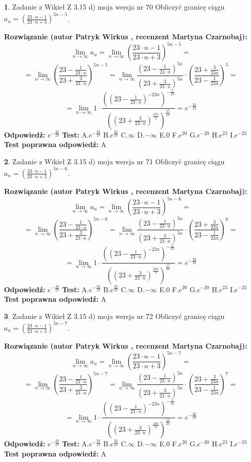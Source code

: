 \documentclass[12pt, a4paper]{article}
\theoremstyle{definition} %
\newtheorem{zad}{}
\newcommand{\zadStart}[1]{\begin{zad}#1\newline}
\newcommand{\zadStop}{\end{zad}}
\newcommand{\rozwStart}[2]{\noindent \textbf{Rozwiązanie (autor #1 , recenzent #2): }\newline}
\newcommand{\rozwStop}{\newline}
\newcommand{\odpStart}{\noindent \textbf{Odpowiedź:}\newline}
\newcommand{\odpStop}{\newline}
\newcommand{\testStart}{\noindent \textbf{Test:}\newline}
\newcommand{\testStop}{\newline}
\newcommand{\kluczStart}{\noindent \textbf{Test poprawna odpowiedź:}\newline}
\newcommand{\kluczStop}{\newline}
\begin{document}
\zadStart{Zadanie z Wikieł Z 3.15 d) moja wersja nr 70}
Obliczyć granicę ciągu $a_{n}=(\frac{23\cdot n - 1}{23 \cdot n + 3})^{5n-5}$.
\zadStop
\rozwStart{Patryk Wirkus}{Martyna Czarnobaj}
$$\lim\limits_{n\to\infty} a_{n} = \lim\limits_{n\to\infty}(\frac{23\cdot n - 1}{23 \cdot n + 3})^{5n-5}=$$
$$=\lim\limits_{n\to\infty}(\frac{23 - \frac{1}{23\cdot n}}{23 + \frac{3}{23 \cdot n}})^{5n-5}=\lim\limits_{n\to\infty}\frac{(23 - \frac{1}{23\cdot n})^{5n}}{(23 + \frac{3}{23\cdot n})^{5n}} \cdot (\frac{23+\frac{3}{23n}}{23-\frac{1}{23n}})^{5}=$$
$$=\lim\limits_{n\to\infty} 1 \cdot \frac{((23-\frac{1}{23 \cdot n})^{-23n})^{-\frac{5}{23}}}{((23+\frac{3}{23 \cdot n})^{\frac{23n}{3}})^{\frac{15}{23}}} =e^{-\frac{20}{23}}$$
\rozwStop
\odpStart
$e^{-\frac{20}{23}}$
\odpStop
\testStart
A.$ e^{-\frac{20}{23}}$
B.$ e^{\frac{20}{23}}$
C.$\infty$
D.$-\infty$
E.$0$
F.$e^{20}$
G.$e^{-20}$
H.$e^{23}$
I.$e^{-23}$
\testStop
\kluczStart
A
\kluczStop



\zadStart{Zadanie z Wikieł Z 3.15 d) moja wersja nr 71}
Obliczyć granicę ciągu $a_{n}=(\frac{23\cdot n - 1}{23 \cdot n + 3})^{5n-6}$.
\zadStop
\rozwStart{Patryk Wirkus}{Martyna Czarnobaj}
$$\lim\limits_{n\to\infty} a_{n} = \lim\limits_{n\to\infty}(\frac{23\cdot n - 1}{23 \cdot n + 3})^{5n-6}=$$
$$=\lim\limits_{n\to\infty}(\frac{23 - \frac{1}{23\cdot n}}{23 + \frac{3}{23 \cdot n}})^{5n-6}=\lim\limits_{n\to\infty}\frac{(23 - \frac{1}{23\cdot n})^{5n}}{(23 + \frac{3}{23\cdot n})^{5n}} \cdot (\frac{23+\frac{3}{23n}}{23-\frac{1}{23n}})^{6}=$$
$$=\lim\limits_{n\to\infty} 1 \cdot \frac{((23-\frac{1}{23 \cdot n})^{-23n})^{-\frac{5}{23}}}{((23+\frac{3}{23 \cdot n})^{\frac{23n}{3}})^{\frac{15}{23}}} =e^{-\frac{20}{23}}$$
\rozwStop
\odpStart
$e^{-\frac{20}{23}}$
\odpStop
\testStart
A.$ e^{-\frac{20}{23}}$
B.$ e^{\frac{20}{23}}$
C.$\infty$
D.$-\infty$
E.$0$
F.$e^{20}$
G.$e^{-20}$
H.$e^{23}$
I.$e^{-23}$
\testStop
\kluczStart
A
\kluczStop



\zadStart{Zadanie z Wikieł Z 3.15 d) moja wersja nr 72}
Obliczyć granicę ciągu $a_{n}=(\frac{23\cdot n - 1}{23 \cdot n + 3})^{5n-7}$.
\zadStop
\rozwStart{Patryk Wirkus}{Martyna Czarnobaj}
$$\lim\limits_{n\to\infty} a_{n} = \lim\limits_{n\to\infty}(\frac{23\cdot n - 1}{23 \cdot n + 3})^{5n-7}=$$
$$=\lim\limits_{n\to\infty}(\frac{23 - \frac{1}{23\cdot n}}{23 + \frac{3}{23 \cdot n}})^{5n-7}=\lim\limits_{n\to\infty}\frac{(23 - \frac{1}{23\cdot n})^{5n}}{(23 + \frac{3}{23\cdot n})^{5n}} \cdot (\frac{23+\frac{3}{23n}}{23-\frac{1}{23n}})^{7}=$$
$$=\lim\limits_{n\to\infty} 1 \cdot \frac{((23-\frac{1}{23 \cdot n})^{-23n})^{-\frac{5}{23}}}{((23+\frac{3}{23 \cdot n})^{\frac{23n}{3}})^{\frac{15}{23}}} =e^{-\frac{20}{23}}$$
\rozwStop
\odpStart
$e^{-\frac{20}{23}}$
\odpStop
\testStart
A.$ e^{-\frac{20}{23}}$
B.$ e^{\frac{20}{23}}$
C.$\infty$
D.$-\infty$
E.$0$
F.$e^{20}$
G.$e^{-20}$
H.$e^{23}$
I.$e^{-23}$
\testStop
\kluczStart
A
\kluczStop
\end{document}
